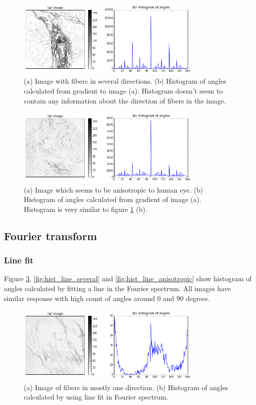 \begin{figure}[H]
\centering
\includegraphics[width=0.8\textwidth]{hist_grad_several}
\caption{(a) Image with fibers in several directions. (b) Histogram of angles calculated from gradient to image (a). Histogram doesn't seem to contain any information about the direction of fibers in the image.}
\label{fig:hist_grad_several}
\end{figure}

\begin{figure}[H]
\centering
\includegraphics[width=0.8\textwidth]{hist_grad_anisotropic}
\caption{(a) Image which seems to be anisotropic to human eye. (b) Histogram of angles calculated from gradient of image (a). Histogram is very similar to figure \ref{fig:hist_grad_several} (b).}
\label{fig:hist_grad_anisotropic}
\end{figure}


%
\subsection{Fourier transform}
\subsubsection{Line fit}
Figure \ref{fig:hist_line_one}, \ref{fig:hist_line_several} and \ref{fig:hist_line_anisotropic} show histogram of angles calculated by fitting a line in the Fourier spectrum. All images have similar response with high count of angles around 0 and 90 degrees.

\begin{figure}[h]
\centering
\includegraphics[width=0.8\textwidth]{hist_line_one}
\caption{(a) Image of fibers in mostly one direction. (b) Histogram of angles calculated by using line fit in Fourier spectrum.}
\label{fig:hist_line_one}
\end{figure}

